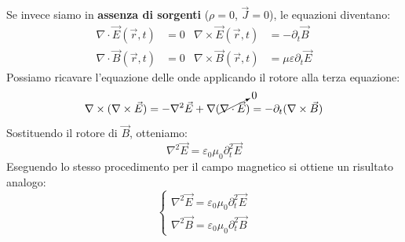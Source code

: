 \documentclass[openany,a4paper,12pt]{book}
\begin{document}
Se invece siamo in \textbf{assenza di sorgenti} ($\rho = 0$, $\vec{J} = 0$), le equazioni diventano:
\begin{align}
    \nabla \cdot \vec{E}(\vec{r},t) &= 0 & \nabla \times \vec{E}(\vec{r},t) &= - \partial_t \vec{B} \\
    \nabla \cdot \vec{B}(\vec{r},t) &= 0 & \nabla \times \vec{B}(\vec{r},t) &= \mu \varepsilon \partial_t \vec{E}
\end{align}
Possiamo ricavare l'equazione delle onde applicando il rotore alla terza equazione:
\begin{equation}
    \nabla \times (\nabla \times \vec{E}) = -\nabla^2 \vec{E} + \nabla(\cancelto{0}{\nabla \cdot \vec{E}}) = -\partial_t (\nabla \times \vec{B})
\end{equation}
Sostituendo il rotore di $\vec{B}$, otteniamo:
\begin{equation}
    \nabla^2 \vec{E} = \varepsilon_0 \mu_0 \partial_t^2 \vec{E}
\end{equation}
Eseguendo lo stesso procedimento per il campo magnetico si ottiene un risultato analogo:
\begin{equation}
    \begin{cases}
        \nabla^2 \vec{E} = \varepsilon_0 \mu_0 \partial_t^2 \vec{E} \\
        \nabla^2 \vec{B} = \varepsilon_0 \mu_0 \partial_t^2 \vec{B}
    \end{cases}
\end{equation}
\end{document}
